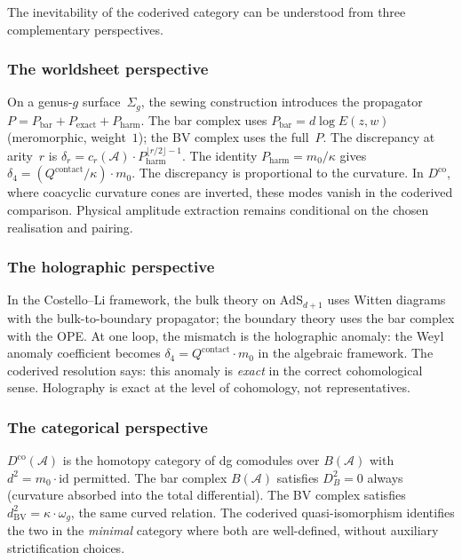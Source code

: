 \documentclass[11pt]{amsart}
\newcommand{\cA}{\mathcal{A}}
\theoremstyle{plain}
\theoremstyle{definition}
\theoremstyle{remark}
\begin{document}
The inevitability of the coderived category can be understood from
three complementary perspectives.

\subsubsection{The worldsheet perspective}

On a genus-$g$ surface~$\Sigma_g$, the sewing construction
introduces the propagator $P = P_{\mathrm{bar}} +
P_{\mathrm{exact}} + P_{\mathrm{harm}}$. The bar complex uses
$P_{\mathrm{bar}} = d\log E(z,w)$ (meromorphic, weight~$1$);
the BV complex uses the full~$P$. The discrepancy at arity~$r$
is $\delta_r = c_r(\cA) \cdot P_{\mathrm{harm}}^{\lfloor
r/2 \rfloor - 1}$. The identity
$P_{\mathrm{harm}} = m_0/\kappa$ gives
$\delta_4 = (Q^{\mathrm{contact}}/\kappa) \cdot m_0$.
The discrepancy is proportional to the curvature. In
$D^{\mathrm{co}}$, where coacyclic curvature cones are inverted,
these modes vanish in the coderived comparison.  Physical amplitude
extraction remains conditional on the chosen realisation and
pairing.

\subsubsection{The holographic perspective}

In the Costello--Li framework, the bulk theory on
$\mathrm{AdS}_{d+1}$ uses Witten diagrams with the
bulk-to-boundary propagator; the boundary theory uses the bar
complex with the OPE. At one loop, the mismatch is the
holographic anomaly: the Weyl anomaly coefficient becomes
$\delta_4 = Q^{\mathrm{contact}} \cdot m_0$ in the algebraic
framework. The coderived resolution says: this anomaly is
\emph{exact} in the correct cohomological sense. Holography is
exact at the level of cohomology, not representatives.

\subsubsection{The categorical perspective}

$D^{\mathrm{co}}(\cA)$ is the homotopy category of dg
comodules over $B(\cA)$ with $d^2 = m_0 \cdot \mathrm{id}$
permitted. The bar complex $B(\cA)$ satisfies $D_B^2 = 0$
always (curvature absorbed into the total differential). The BV
complex satisfies $d^2_{\mathrm{BV}} = \kappa \cdot \omega_g$,
the same curved relation. The coderived quasi-isomorphism
identifies the two in the \emph{minimal} category where both are
well-defined, without auxiliary strictification choices.
\end{document}
